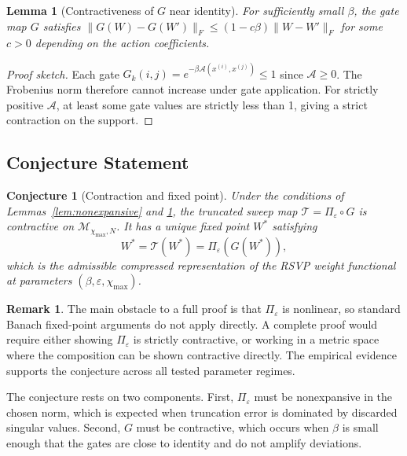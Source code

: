 \documentclass[11pt]{article}
\newtheorem{lemma}[theorem]{Lemma}
\newtheorem{conjecture}[theorem]{Conjecture}
\theoremstyle{definition}
\newtheorem{remark}[theorem]{Remark}
\begin{document}
\begin{lemma}[Contractiveness of $G$ near identity]
  \label{lem:contractive}
  For sufficiently small $\beta$, the gate map $G$ satisfies
  $\|G(W) - G(W')\|_F \le (1 - c\beta)\|W - W'\|_F$
  for some $c > 0$ depending on the action coefficients.
\end{lemma}

\begin{proof}[Proof sketch]
  Each gate $G_k(i,j) = e^{-\beta\mathcal{A}(x^{(i)},x^{(j)})} \le 1$
  since $\mathcal{A} \ge 0$. The Frobenius norm therefore cannot increase under
  gate application. For strictly positive $\mathcal{A}$, at least some gate
  values are strictly less than 1, giving a strict contraction on the support.
\end{proof}

\subsection{Conjecture Statement}

\begin{conjecture}[Contraction and fixed point]
  \label{conj:main}
  Under the conditions of Lemmas~\ref{lem:nonexpansive} and
  \ref{lem:contractive}, the truncated sweep map $\mathcal{T} = \Pi_\varepsilon
  \circ G$ is contractive on $\mathcal{M}_{\chi_{\max},N}$. It has a unique
  fixed point $W^*$ satisfying
  \begin{equation}
    W^* = \mathcal{T}(W^*) = \Pi_\varepsilon(G(W^*)),
    \label{eq:fixed_point}
  \end{equation}
  which is the admissible compressed representation of the RSVP weight
  functional at parameters $(\beta, \varepsilon, \chi_{\max})$.
\end{conjecture}

\begin{remark}
  The main obstacle to a full proof is that $\Pi_\varepsilon$ is nonlinear,
  so standard Banach fixed-point arguments do not apply directly. A complete
  proof would require either showing $\Pi_\varepsilon$ is strictly contractive,
  or working in a metric space where the composition can be shown contractive
  directly. The empirical evidence supports the conjecture across all tested
  parameter regimes.
\end{remark}

The conjecture rests on two components. First, $\Pi_\varepsilon$ must be
nonexpansive in the chosen norm, which is expected when truncation error is
dominated by discarded singular values. Second, $G$ must be contractive, which
occurs when $\beta$ is small enough that the gates are close to identity and do
not amplify deviations.
\end{document}
